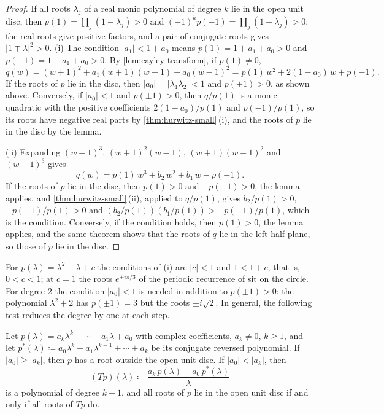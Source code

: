 \begin{proof}
If all roots $\lambda_j$ of a real monic polynomial of degree $k$ lie in the open unit disc, then $p(1)=\prod_j(1-\lambda_j)>0$ and $(-1)^kp(-1)=\prod_j(1+\lambda_j)>0$: the real roots give positive factors, and a pair of conjugate roots gives $|1\mp\lambda|^2>0$. (i) The condition $|a_1|<1+a_0$ means $p(1)=1+a_1+a_0>0$ and $p(-1)=1-a_1+a_0>0$. By \cref{lem:cayley-transform}, if $p(1)\ne0$,
\[
q(w)=(w+1)^2+a_1(w+1)(w-1)+a_0(w-1)^2=p(1)\,w^2+2(1-a_0)\,w+p(-1).
\]
If the roots of $p$ lie in the disc, then $|a_0|=|\lambda_1\lambda_2|<1$ and $p(\pm1)>0$, as shown above. Conversely, if $|a_0|<1$ and $p(\pm1)>0$, then $q/p(1)$ is a monic quadratic with the positive coefficients $2(1-a_0)/p(1)$ and $p(-1)/p(1)$, so its roots have negative real parts by \cref{thm:hurwitz-small}\,(i), and the roots of $p$ lie in the disc by the lemma.

(ii) Expanding $(w+1)^3$, $(w+1)^2(w-1)$, $(w+1)(w-1)^2$ and $(w-1)^3$ gives
\[
q(w)=p(1)\,w^3+b_2\,w^2+b_1\,w-p(-1).
\]
If the roots of $p$ lie in the disc, then $p(1)>0$ and $-p(-1)>0$, the lemma applies, and \cref{thm:hurwitz-small}\,(ii), applied to $q/p(1)$, gives $b_2/p(1)>0$, $-p(-1)/p(1)>0$ and $(b_2/p(1))(b_1/p(1))>-p(-1)/p(1)$, which is the condition. Conversely, if the condition holds, then $p(1)>0$, the lemma applies, and the same theorem shows that the roots of $q$ lie in the left half-plane, so those of $p$ lie in the disc.
\end{proof}

For $p(\lambda)=\lambda^2-\lambda+c$ the conditions of (i) are $|c|<1$ and $1<1+c$, that is, $0<c<1$; at $c=1$ the roots $e^{\pm i\pi/3}$ of the periodic recurrence of  sit on the circle. For degree $2$ the condition $|a_0|<1$ is needed in addition to $p(\pm1)>0$: the polynomial $\lambda^2+2$ has $p(\pm1)=3$ but the roots $\pm i\sqrt2$. In general, the following test reduces the degree by one at each step.

\begin{theorem}
\label{thm:schur-cohn}
Let $p(\lambda)=a_k\lambda^k+\cdots+a_1\lambda+a_0$ with complex coefficients, $a_k\ne0$, $k\ge1$, and let $p^*(\lambda)\coloneqq\bar a_0\lambda^k+\bar a_1\lambda^{k-1}+\cdots+\bar a_k$ be its conjugate reversed polynomial. If $|a_0|\ge|a_k|$, then $p$ has a root outside the open unit disc. If $|a_0|<|a_k|$, then
\[
(Tp)(\lambda)\coloneqq\frac{\bar a_k\,p(\lambda)-a_0\,p^*(\lambda)}{\lambda}
\]
is a polynomial of degree $k-1$, and all roots of $p$ lie in the open unit disc if and only if all roots of $Tp$ do.
\end{theorem}

